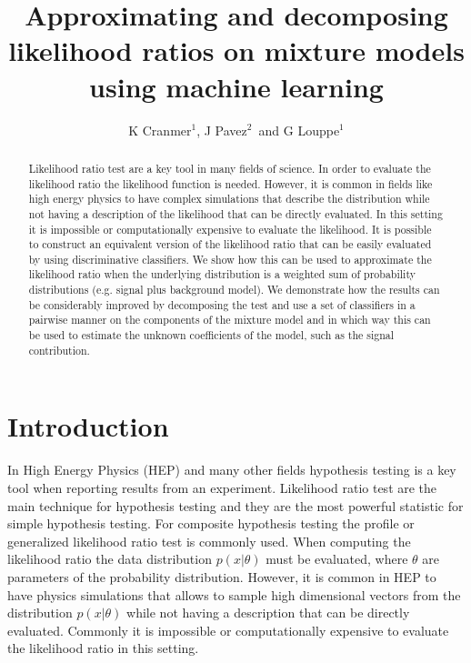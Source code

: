 \documentclass[a4paper]{jpconf}
\begin{document}
\title{Approximating and decomposing likelihood ratios on mixture models using machine learning}

\author{K Cranmer$^1$, J Pavez$^2$\ and
G Louppe$^1$}%

\address{$^1$ Physics Department, New York University, New York, NY 10003, U.S.A.}
\address{$^2$ Informatics Department, Universidad T\'ecnica Federico Santa Mar\'ia, 1240 Av. Espa\~na, Valpara\'iso, Chile}



\begin{abstract}
Likelihood ratio test are a key tool in many fields of science. In order to evaluate the likelihood ratio the likelihood function is needed. However, it is common in fields like high energy physics to have complex simulations that describe the distribution while not having a description of the likelihood that can be directly evaluated. In this setting it is impossible or computationally expensive to evaluate the likelihood. It is possible to construct an equivalent version of the likelihood ratio that can be easily evaluated by using discriminative classifiers. We show how this can be used to approximate the likelihood ratio when the underlying distribution is a weighted sum of probability distributions (e.g. signal plus background model). We demonstrate how the results can be considerably improved by decomposing the test and use a set of classifiers in a pairwise manner on the components of the mixture model and in which way this can be used to estimate the unknown coefficients of the model, such as the signal contribution.
\end{abstract}
\section{Introduction}

In High Energy Physics (HEP) and many other fields hypothesis testing is a key tool when reporting results from an experiment. Likelihood ratio test are 
the main technique for hypothesis testing and they are the most powerful statistic for simple hypothesis testing. For composite hypothesis 
testing the profile or generalized likelihood ratio test is commonly used. When computing the likelihood ratio the data distribution $p(x|\theta)$ must 
be evaluated, where $\theta$ are parameters of the probability distribution. However, it is common in HEP to have physics simulations that allows to sample high dimensional vectors from the distribution $p(x|\theta)$ while not having a description that can be directly evaluated. Commonly it is impossible or computationally expensive to evaluate the likelihood ratio in this setting. %
\end{document}
